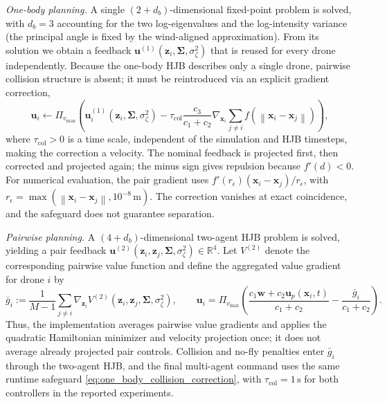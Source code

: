 \documentclass{article}
\newcommand{\R}{\mathbb{R}}
\newcommand{\norm}[1]{\left\|#1\right\|}
\newcommand{\bs}[1]{\boldsymbol{#1}}
\newcommand{\x}{\mathbf{x}}
\renewcommand{\u}{\mathbf{u}}
\newcommand{\z}{\mathbf{z}}
\begin{document}
\emph{One-body planning.}
A single $(2+d_b)$-dimensional fixed-point problem is solved, with $d_b=3$ accounting for the two log-eigenvalues and the log-intensity variance (the principal angle is fixed by the wind-aligned approximation).
From its solution we obtain a feedback $\u^{(1)}(\z_i,\bs\Sigma,\sigma_\zeta^2)$ that is reused for every drone independently.
Because the one-body HJB describes only a single drone, pairwise collision structure is absent; it must be reintroduced via an explicit gradient correction,
\begin{equation}
\label{eq:one_body_collision_correction}
\u_i \leftarrow \Pi_{v_{\max}}\!\left(
\u_i^{(1)}(\z_i,\bs\Sigma,\sigma_\zeta^2)
-\tau_{\mathrm{col}}\frac{c_3}{c_1+c_2}\nabla_{\x_i}\!\sum_{j\ne i}f(\norm{\x_i-\x_j})
\right),
\end{equation}
where $\tau_{\mathrm{col}}>0$ is a time scale, independent of the simulation and HJB timesteps, making the correction a velocity.
The nominal feedback is projected first, then corrected and projected again; the minus sign gives repulsion because $f'(d)<0$.
For numerical evaluation, the pair gradient uses $f'(r_\epsilon)(\x_i-\x_j)/r_\epsilon$, with $r_\epsilon=\max(\norm{\x_i-\x_j},10^{-8}\,\mathrm{m})$.
The correction vanishes at exact coincidence, and the safeguard does not guarantee separation.

\emph{Pairwise planning.}
A $(4+d_b)$-dimensional two-agent HJB problem is solved, yielding a pair feedback $\u^{(2)}(\z_i,\z_j,\bs\Sigma,\sigma_\zeta^2)\in\R^{4}$.
Let $V^{(2)}$ denote the corresponding pairwise value function and define the aggregated value gradient for drone $i$ by
\begin{equation}
\label{eq:pairwise_control}
\bar g_i
:=\frac{1}{M-1}\sum_{j\ne i}
\nabla_{\z_i}V^{(2)}(\z_i,\z_j,\bs\Sigma,\sigma_\zeta^2),
\qquad
\u_i
=\Pi_{v_{\max}}\!\left(
\frac{c_1\bs w+c_2\u_p(\x_i,t)}{c_1+c_2}
-\frac{\bar g_i}{c_1+c_2}
\right).
\end{equation}
Thus, the implementation averages pairwise value gradients and applies the quadratic Hamiltonian minimizer and velocity projection once; it does not average already projected pair controls.
Collision and no-fly penalties enter $\bar g_i$ through the two-agent HJB, and the final multi-agent command uses the same runtime safeguard \eqref{eq:one_body_collision_correction}, with $\tau_{\mathrm{col}}=1\,\mathrm{s}$ for both controllers in the reported experiments.
\end{document}
